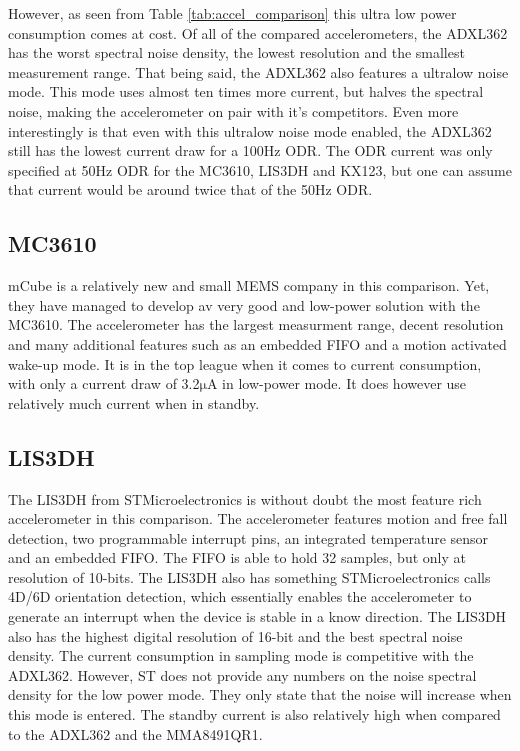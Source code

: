 However, as seen from Table \ref{tab:accel_comparison} this ultra low power consumption comes at cost. Of all of the compared accelerometers, the ADXL362 has the worst spectral noise density, the lowest resolution and the smallest measurement range. That being said, the ADXL362 also features a ultralow noise mode. This mode uses almost ten times more current, but halves the spectral noise, making the accelerometer on pair with it's competitors. Even more interestingly is that even with this ultralow noise mode enabled, the ADXL362 still has the lowest current draw for a 100Hz ODR. The ODR current was only specified at 50Hz ODR for the MC3610, LIS3DH and KX123, but one can assume that current would be around twice that of the 50Hz ODR.

\subsection{MC3610}
mCube is a relatively new and small MEMS company in this comparison. Yet, they have managed to develop av very good and low-power solution with the MC3610. The accelerometer has the largest measurment range, decent resolution and many additional features such as an embedded FIFO and a motion activated wake-up mode. It is in the top league when it comes to current consumption, with only a current draw of 3.2$\si{\micro\ampere}$ in low-power mode. It does however use relatively much current when in standby.

\subsection{LIS3DH}

The LIS3DH from STMicroelectronics is without doubt the most feature rich accelerometer in this comparison. The accelerometer features motion and free fall detection, two programmable interrupt pins, an integrated temperature sensor and an embedded FIFO. The FIFO is able to hold 32 samples, but only at resolution of 10-bits. The LIS3DH also has something STMicroelectronics calls 4D/6D orientation detection, which essentially enables the accelerometer to generate an interrupt when the device is stable in a know direction. The LIS3DH also has the highest digital resolution of 16-bit and the best spectral noise density. The current consumption in sampling mode is competitive with the ADXL362. However, ST does not provide any numbers on the noise spectral density for the low power mode. They only state that the noise will increase when this mode is entered. The standby current is also relatively high when compared to the ADXL362 and the MMA8491QR1. 

